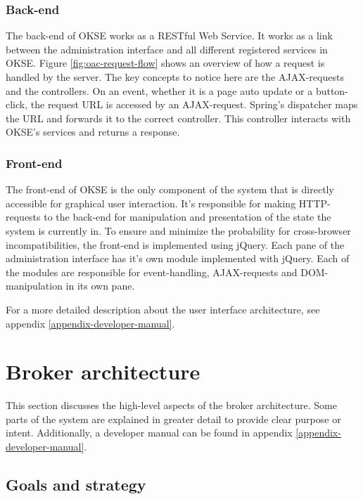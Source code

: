 \subsubsection{Back-end}

The back-end of OKSE works as a RESTful Web Service. It works as a link between the administration interface and all different registered services in OKSE. Figure \ref{fig:oac-request-flow} shows an overview of how a request is handled by the server. The key concepts to notice here are the AJAX-requests and the controllers. On an event, whether it is a page auto update or a button-click, the request URL is accessed by an AJAX-request. Spring's dispatcher maps the URL and forwards it to the correct controller. This controller interacts with OKSE's services and returns a response. 

\subsubsection{Front-end}

The front-end of OKSE is the only component of the system that is directly accessible for graphical user interaction. It's responsible for making HTTP-requests to the back-end for manipulation and presentation of the state the system is currently in. To ensure and minimize the probability for cross-browser incompatibilities, the front-end is implemented using jQuery. Each pane of the administration interface has it's own module implemented with jQuery. Each of the modules are responsible for event-handling, AJAX-requests and DOM-manipulation in its own pane.  

For a more detailed description about the user interface architecture, see appendix \ref{appendix-developer-manual}.

\section{Broker architecture}
\label{sec:architecture_and_implementation-broker_architecture}

This section discusses the high-level aspects of the broker architecture. Some parts of the system are explained in greater detail to provide clear purpose or intent. Additionally, a developer manual can be found in appendix \ref{appendix-developer-manual}.

\subsection{Goals and strategy}
\label{subsec:architecture_and_implementation-broker_architecture-goals_and_strategy}

